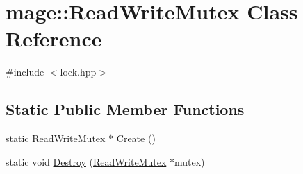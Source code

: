 \hypertarget{classmage_1_1_read_write_mutex}{}\section{mage\+:\+:Read\+Write\+Mutex Class Reference}
\label{classmage_1_1_read_write_mutex}


{\ttfamily \#include $<$lock.\+hpp$>$}

\subsection*{Static Public Member Functions}
\begin{DoxyCompactItemize}
\item 
static \hyperlink{classmage_1_1_read_write_mutex}{Read\+Write\+Mutex} $\ast$ \hyperlink{classmage_1_1_read_write_mutex_ad184ba46c44446b5ebe1026801fcac9b}{Create} ()
\item 
static void \hyperlink{classmage_1_1_read_write_mutex_a879992fe8bf7fc81df9fa5ffa1c380a3}{Destroy} (\hyperlink{classmage_1_1_read_write_mutex}{Read\+Write\+Mutex} $\ast$mutex)
\end{DoxyCompactItemize}
